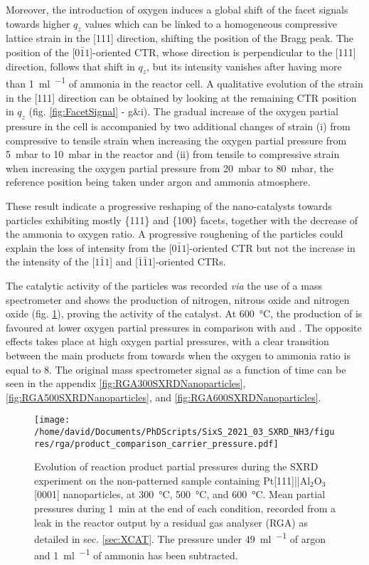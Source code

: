 Moreover, the introduction of oxygen induces a global shift of the facet signals towards higher $q_z$ values which can be linked to a homogeneous compressive lattice strain in the [111] direction, shifting the position of the Bragg peak.
The position of the [$0\bar{1}1$]-oriented CTR, whose direction is perpendicular to the [111] direction, follows that shift in $q_z$, but its intensity vanishes after having more than \qty{1}{\ml\per\min} of ammonia in the reactor cell.
A qualitative evolution of the strain in the [111] direction can be obtained by looking at the remaining CTR position in $q_z$ (fig. \ref{fig:FacetSignal} - g\&i).
The gradual increase of the oxygen partial pressure in the cell is accompanied by two additional changes of strain (i) from compressive to tensile strain when increasing the oxygen partial pressure from \qty{5}{\milli\bar} to \qty{10}{\milli\bar} in the reactor and (ii) from tensile to compressive strain when increasing the oxygen partial pressure from \qty{20}{\milli\bar} to \qty{80}{\milli\bar}, the reference position being taken under argon and ammonia atmosphere.

These result indicate a progressive reshaping of the nano-catalysts towards particles exhibiting mostly \{111\} and \{100\} facets, together with the decrease of the ammonia to oxygen ratio.
A progressive roughening of the particles could explain the loss of intensity from the [$0\bar{1}1$]-oriented CTR but not the increase in the intensity of the [$1\bar{1}1$] and [$\bar{1}\bar{1}1$]-oriented CTRs.

The catalytic activity of the particles was recorded \textit{via} the use of a mass spectrometer and shows the production of nitrogen, nitrous oxide and nitrogen oxide (fig. \ref{fig:RGASXRDNanoparticlesComparison}), proving the activity of the catalyst.
At \qty{600}{\degreeCelsius}, the production of  is favoured at lower oxygen partial pressures in comparison with  and .
The opposite effects takes place at high oxygen partial pressures, with a clear transition between the main products from  towards  when the oxygen to ammonia ratio is equal to 8.
The original mass spectrometer signal as a function of time can be seen in the appendix \ref{fig:RGA300SXRDNanoparticles}, \ref{fig:RGA500SXRDNanoparticles}, and \ref{fig:RGA600SXRDNanoparticles}.

\begin{figure}[!htb]
    \centering
    \texttt{[image: /home/david/Documents/PhDScripts/SixS\_2021\_03\_SXRD\_NH3/figures/rga/product\_comparison\_carrier\_pressure.pdf]}
    \caption{
        Evolution of reaction product partial pressures during the SXRD experiment on the non-patterned sample containing Pt[111]||Al$_2$O$_3$[0001] nanoparticles, at \qty{300}{\degreeCelsius}, \qty{500}{\degreeCelsius}, and \qty{600}{\degreeCelsius}.
        Mean partial pressures during \qty{1}{\minute} at the end of each condition, recorded from a leak in the reactor output by a residual gas analyser (RGA) as detailed in sec. \ref{sec:XCAT}.
        The pressure under \qty{49}{\ml\per\min} of argon and \qty{1}{\ml\per\min} of ammonia has been subtracted.
    }
    \label{fig:RGASXRDNanoparticlesComparison}
\end{figure}

